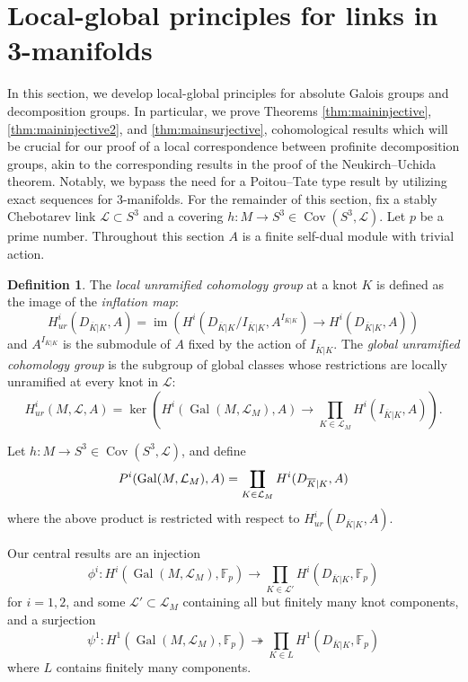 \documentclass{amsart}
\theoremstyle{plain}
\theoremstyle{definition}
\newtheorem{Def}[theorem]{Definition}
\theoremstyle{plain}
\theoremstyle{plain}
\theoremstyle{plain}
\theoremstyle{remark}
\theoremstyle{remark}
\theoremstyle{plain}
\theoremstyle{definition}
\theoremstyle{plain}
\DeclareMathOperator{\Gal}{\mathrm{Gal}}
\DeclareMathOperator{\Cov}{\mathrm{Cov}}
\DeclareMathOperator{\im}{\mathrm{im}}
\newcounter{main}
\theoremstyle{plain}
\theoremstyle{plain}
\def\doubleprod#1#2{\ooalign{$#1\prod$\cr$#1\coprod$\cr}}
\DeclareMathOperator*{\Rprod}{\mathpalette\doubleprod\relax}
\numberwithin{equation}{section}
\begin{document}
\section{Local-global principles for links in 3-manifolds}\label{sec:Local-Global}

In this section, we develop local-global principles for absolute Galois groups and decomposition groups. In particular, we prove Theorems \ref{thm:maininjective}, \ref{thm:maininjective2}, and \ref{thm:mainsurjective}, cohomological results which will be crucial for our proof of a local correspondence between profinite decomposition groups, akin to the corresponding results in the proof of the Neukirch--Uchida theorem. Notably, we bypass the need for a Poitou--Tate type result by utilizing exact sequences for 3-manifolds. For the remainder of this section, fix a stably Chebotarev link $\mathcal{L} \subset S^3$ and a covering $h: M \to S^3 \in \Cov(S^3, \mathcal{L})$. Let $p$ be a prime number. Throughout this section $A$ is a finite self-dual module with trivial action.

\begin{Def}
The \emph{local unramified cohomology group} at a knot $K$ is defined as the image of the \emph{inflation map}:
\begin{equation}
    H^i_{ur}(D_{\overline{K}|K}, A) = \im\left(H^i(D_{\overline{K}|K}/I_{\overline{K}|K}, A^{I_{\overline{K}|K}}) \to H^i(D_{\overline{K}|K}, A)\right)
\end{equation}
 and $A^{I_{\overline{K}|K}}$ is the submodule of $A$ fixed by the action of $I_{\overline{K}|K}$. The \emph{global unramified cohomology group} is the subgroup of global classes whose restrictions are locally unramified at every knot in $\mathcal{L}$:
\begin{equation}
    H^i_{ur}(M, \mathcal{L}, A) = \ker\left(H^i(\Gal(M, \mathcal{L}_M), A) \to \prod_{K \in \mathcal{L}_M}H^i(I_{\overline{K}|K}, A)\right).
\end{equation}
\end{Def}

Let $h: M \to S^3 \in \Cov(S^3, \mathcal{L})$, and define
\begin{equation}
    P^i(\Gal(M, \mathcal{L}_M), A) = \Rprod_{K \in \mathcal{L}_M}H^i(D_{\overline{K}|K}, A)
\end{equation}
where the above product is restricted with respect to $H^i_{ur}(D_{\overline{K}|K}, A)$.

\medskip

Our central results are an injection
\begin{equation}
    \phi^i: H^i(\Gal(M, \mathcal{L}_M), \mathbb{F}_p) \to \prod_{K \in \mathcal{L}'}H^i(D_{\overline{K}|K}, \mathbb{F}_p)
\end{equation}
for $i = 1, 2$, and some $\mathcal{L}' \subset \mathcal{L}_M$ containing all but finitely many knot components, and a surjection
\begin{equation}
   \psi^1: H^1(\Gal(M, \mathcal{L}_M), \mathbb{F}_p) \twoheadrightarrow \prod_{K \in L}H^1(D_{\overline{K}|K}, \mathbb{F}_p)
\end{equation}
where $L$ contains finitely many components.
\end{document}
